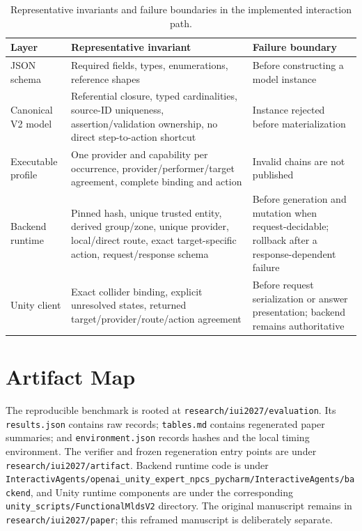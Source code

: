 \begin{table}[h]
  \caption{Representative invariants and failure boundaries in the implemented
  interaction path.}
  \label{tab:enforcement-layers}
  \small
  \begin{tabularx}{\textwidth}{@{}p{31mm}Y Y@{}}
    \toprule
    Layer & Representative invariant & Failure boundary \\
    \midrule
    JSON schema
      & Required fields, types, enumerations, reference shapes
      & Before constructing a model instance \\
    Canonical V2 model
      & Referential closure, typed cardinalities, source-ID uniqueness,
        assertion/validation ownership, no direct step-to-action shortcut
      & Instance rejected before materialization \\
    Executable profile
      & One provider and capability per occurrence, provider/performer/target
        agreement, complete binding and action
      & Invalid chains are not published \\
    Backend runtime
      & Pinned hash, unique trusted entity, derived group/zone, unique provider,
        local/direct route, exact target-specific action, request/response schema
      & Before generation and mutation when request-decidable; rollback after a
        response-dependent failure \\
    Unity client
      & Exact collider binding, explicit unresolved states, returned
        target/provider/route/action agreement
      & Before request serialization or answer presentation; backend remains
        authoritative \\
    \bottomrule
  \end{tabularx}
\end{table}

\section{Artifact Map}

The reproducible benchmark is rooted at
\texttt{research/iui2027/evaluation}.  Its \texttt{results.json} contains raw
records; \texttt{tables.md} contains regenerated paper summaries; and
\texttt{environment.json} records hashes and the local timing environment.
The verifier and frozen regeneration entry points are under
\texttt{research/iui2027/artifact}.  Backend runtime code is under
\texttt{InteractivAgents/openai\_unity\_expert\_npcs\_pycharm/InteractiveAgents/backend},
and Unity runtime components are under the corresponding
\texttt{unity\_scripts/FunctionalMldsV2} directory.  The original manuscript
remains in \texttt{research/iui2027/paper}; this reframed manuscript is
deliberately separate.
